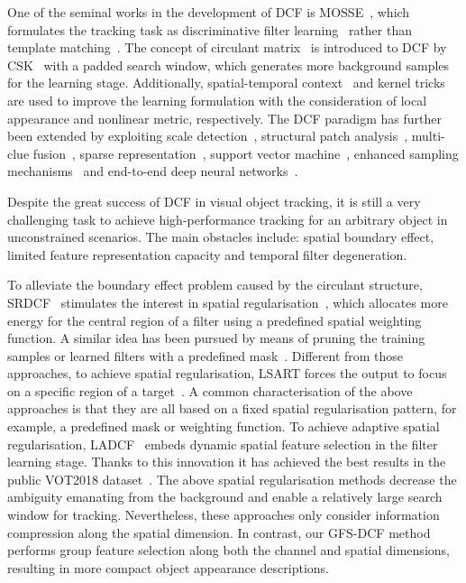 \documentclass[10pt,twocolumn,letterpaper]{article}
\begin{document}
One of the seminal works in the development of DCF is MOSSE~\cite{Bolme2010Visual}, which formulates the tracking task as discriminative filter learning~\cite{bolme2009average} rather than template matching~\cite{briechle2001template}.
The concept of circulant matrix~\cite{Gray2006Toeplitz} is introduced to DCF by CSK~\cite{Henriques2012Exploiting} with a padded search window, which generates more background samples for the learning stage.
Additionally, spatial-temporal context~\cite{Zhang2014Fast} and kernel tricks~\cite{Henriques2015High} are used to improve the learning formulation with the consideration of local appearance and nonlinear metric, respectively.
The DCF paradigm has further been extended by exploiting scale detection~\cite{li2014scale,danelljan2014accurate,danelljan2017discriminative}, structural patch analysis~\cite{li2015reliable,Liu2015Real,Liu2016Structural}, multi-clue fusion~\cite{tang2015multi,Ma2015Long,Hong2015MUlti,Bertinetto2016Staple,tang2018high}, sparse representation~\cite{Zhang2016In,zhang2018robust}, support vector machine~\cite{wang2017large,zuo2018learning}, enhanced sampling mechanisms~\cite{zhang2017multi,mueller2017context} and end-to-end deep neural networks~\cite{valmadre2017end,song-iccv17-CREST}. 

Despite the great success of DCF in visual object tracking, it is still a very challenging task to achieve high-performance tracking for an arbitrary object in unconstrained scenarios.
The main obstacles include: spatial boundary effect, limited feature representation capacity and temporal filter degeneration.

To alleviate the boundary effect problem caused by the circulant structure, SRDCF~\cite{Danelljan2015Learning} stimulates the interest in spatial regularisation~\cite{danelljan2016adaptive,Danelljan2016Beyond,Danelljan2016ECO,li2018learning}, which allocates more energy for the central region of a filter using a predefined spatial weighting function. 
A similar idea has been pursued by means of pruning the training samples or learned filters with a predefined mask~\cite{Galoogahi2015Correlation,Lukezic2017Discriminative,Galoogahi2017Learning,li2018learning}.
Different from those approaches, to achieve spatial regularisation, LSART forces the output to focus on a specific region of a target~\cite{sun2018learning}.
A common characterisation of the above approaches is that they are all based on a fixed spatial regularisation pattern, for example, a predefined mask or weighting function.
To achieve adaptive spatial regularisation, LADCF~\cite{xu2018learning} embeds dynamic spatial feature selection in the filter learning stage. Thanks to this innovation it has achieved the best results in the public VOT2018 dataset~\cite{Kristan2018a}.
The above spatial regularisation methods decrease the ambiguity emanating from the background and enable a relatively large search window for tracking.
Nevertheless, these approaches only consider information compression along the spatial dimension.
In contrast, our GFS-DCF method performs group feature selection along both the channel and spatial dimensions, resulting in more compact object appearance descriptions.
\end{document}
